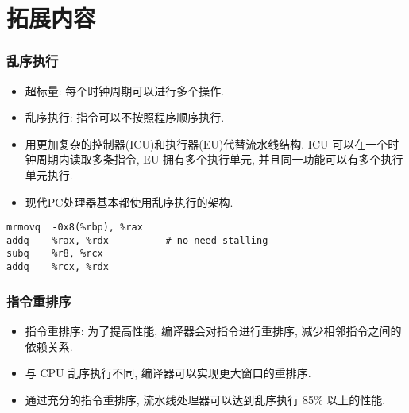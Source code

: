 \documentclass{ctexbeamer}
\newcommand{\ftitle}[1]{\frametitle{\hspace{4ex} {#1}}}
\begin{document}
\section{拓展内容}
\begin{frame}[fragile]
    \ftitle{乱序执行}
    \begin{itemize}
        \item<2- > 超标量: 每个时钟周期可以进行多个操作.
        \item<2- > 乱序执行: 指令可以不按照程序顺序执行.
        \item<3- > 用更加复杂的控制器(ICU)和执行器(EU)代替流水线结构.
            ICU 可以在一个时钟周期内读取多条指令,
            EU 拥有多个执行单元, 并且同一功能可以有多个执行单元执行.
        \item<4- > 现代PC处理器基本都使用乱序执行的架构.
    \end{itemize}

    \begin{lstlisting}
mrmovq  -0x8(%rbp), %rax
addq    %rax, %rdx          # no need stalling
subq    %r8, %rcx
addq    %rcx, %rdx
    \end{lstlisting}
\end{frame}

\begin{frame}
    \ftitle{指令重排序}
    \begin{itemize}
        \item<2- > 指令重排序: 为了提高性能, 编译器会对指令进行重排序,
            减少相邻指令之间的依赖关系.
        \item<3- > 与 CPU 乱序执行不同, 编译器可以实现更大窗口的重排序.
        \item<4- > 通过充分的指令重排序, 流水线处理器可以达到乱序执行 85\% 以上的性能\footnotemark.
    \end{itemize}

\end{frame}
\end{document}

